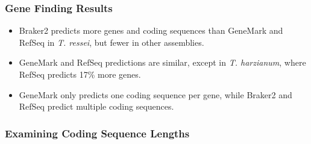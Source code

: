 \documentclass[t]{beamer}
\begin{document}
\begin{frame}
	\frametitle{Gene Finding Results}
	\centering
	\begin{itemize}
		\item Braker2 predicts more genes and coding sequences than GeneMark and RefSeq in \textit{T. ressei}, but fewer in other assemblies.
		\item GeneMark and RefSeq predictions are similar, except in \textit{T. harzianum}, where RefSeq predicts 17\% more genes.
		\item GeneMark only predicts one coding sequence per gene, while Braker2 and RefSeq predict multiple coding sequences.
	\end{itemize}
\end{frame}

\begin{frame}
	\frametitle{Examining Coding Sequence Lengths}
\end{frame}
\end{document}
